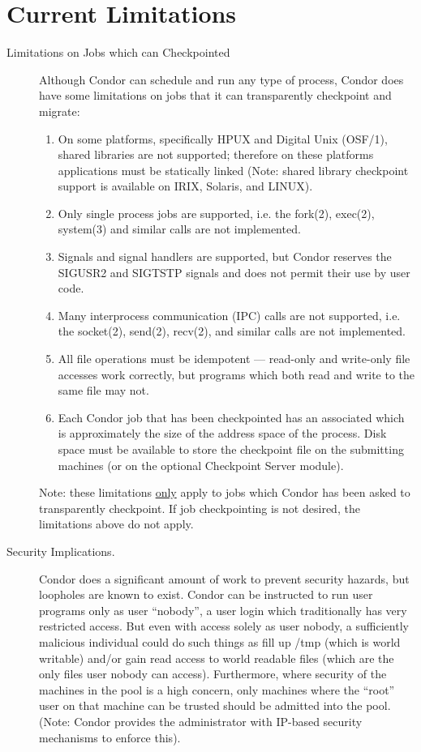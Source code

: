 \section{Current Limitations}

\begin{description}

	\item[Limitations on Jobs which can Checkpointed] Although Condor can schedule and
run any type of process, Condor does have some limitations on jobs that it can
transparently checkpoint and migrate:
\begin{enumerate}
	\item On some platforms, specifically HPUX and Digital Unix
(OSF/1), shared libraries are not supported; therefore on these
platforms applications must be statically linked (Note: shared library
checkpoint support is available on IRIX, Solaris, and LINUX). 
	\item Only single process jobs are supported, i.e. the fork(2), exec(2),
system(3) and similar calls are not implemented.
	\item Signals and signal handlers are supported, but Condor reserves the 
SIGUSR2 and SIGTSTP signals and does not permit their use by user code.
	\item Many interprocess communication (IPC) calls are not supported, i.e. the 
socket(2), send(2), recv(2), and similar calls are not implemented.
	\item All file operations must be idempotent --- read-only and write-only file 
accesses work correctly, but programs which both read and write to the 
same file may not.
	\item Each Condor job that has been checkpointed has an associated 
 which is approximately the size of the address space of the 
process. Disk space must be available to store the checkpoint file on the 
submitting machines (or on the optional Checkpoint Server module).
\end{enumerate}

	Note: these limitations \underline{only} apply to jobs which Condor
has been asked to transparently checkpoint.  If job checkpointing is not
desired, the limitations above do not apply.

	\item[Security Implications.] Condor does a significant amount of work to prevent 
security hazards, but loopholes are known to exist.  Condor can be instructed 
to run user programs only as user ``nobody'', a user login which traditionally has very 
restricted access.  But even with access solely as user nobody, a sufficiently 
malicious individual could do such things as fill up /tmp (which is world writable) and/or gain 
read access to world readable files (which are the only files user nobody can 
access).  Furthermore, where security of the machines in the pool is a high concern, 
only machines where the ``root'' user on that machine can be trusted should be admitted
into the pool.  (Note: Condor provides the administrator with IP-based security mechanisms 
to enforce this).


\end{description}
